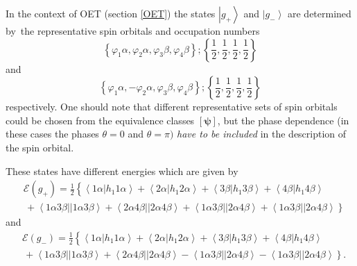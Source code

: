 \documentclass[aps,preprint]{revtex4}%
\begin{document}
In the context of OET (section \ref{OET}) the states $\left\vert
g_{+}\right\rangle $ and $\left\vert g_{-}\right\rangle $ are determined
by\ the representative spin orbitals and occupation numbers
\begin{equation}
\left\{  \varphi_{1}\alpha,\varphi_{2}\alpha,\varphi_{3}\beta,\varphi_{4}%
\beta\right\}  ;\left\{  \frac{1}{2},\frac{1}{2},\frac{1}{2},\frac{1}%
{2}\right\}
\end{equation}
and%
\begin{equation}
\left\{  \varphi_{1}\alpha,-\varphi_{2}\alpha,\varphi_{3}\beta,\varphi
_{4}\beta\right\}  ;\left\{  \frac{1}{2},\frac{1}{2},\frac{1}{2},\frac{1}%
{2}\right\}
\end{equation}
respectively. One should note that different representative sets of spin
orbitals could be chosen from the equivalence classes $\left[
\bm{\psi }\right]  $, but the phase dependence (in these cases the phases
$\theta=0$ and $\theta=\pi)$ \emph{have to be included} in the description of
the spin orbital.

These states have different energies which are given by
\begin{align}
&  \mathcal{E}\left(  g_{+}\right)  =\frac{1}{2}\left\{  \overset
{}{\left\langle 1\alpha\left\vert h_{1}1\alpha\right.  \right\rangle
+\left\langle 2\alpha\left\vert h_{1}2\alpha\right.  \right\rangle
+\left\langle 3\beta\left\vert h_{1}3\beta\right.  \right\rangle +\left\langle
4\beta\left\vert h_{1}4\beta\right.  \right\rangle }\right. \nonumber\\
&  \left.  \,+\left\langle 1\alpha3\beta\right\vert \left\vert 1\alpha
3\beta\right\rangle +\left\langle 2\alpha4\beta\right\vert \left\vert
2\alpha4\beta\right\rangle +\left\langle 1\alpha3\beta\right\vert \left\vert
2\alpha4\beta\right\rangle +\left\langle 1\alpha3\beta\right\vert \left\vert
2\alpha4\beta\right\rangle \overset{}{}\right\}  \label{E+}%
\end{align}
and
\begin{align}
&  \mathcal{E}\left(  g_{-}\right)  =\frac{1}{2}\left\{  \overset
{}{\left\langle 1\alpha\left\vert h_{1}1\alpha\right.  \right\rangle
+\left\langle 2\alpha\left\vert h_{1}2\alpha\right.  \right\rangle
+\left\langle 3\beta\left\vert h_{1}3\beta\right.  \right\rangle +\left\langle
4\beta\left\vert h_{1}4\beta\right.  \right\rangle }\right. \nonumber\\
&  \left.  \,+\left\langle 1\alpha3\beta\right\vert \left\vert 1\alpha
3\beta\right\rangle +\left\langle 2\alpha4\beta\right\vert \left\vert
2\alpha4\beta\right\rangle -\left\langle 1\alpha3\beta\right\vert \left\vert
2\alpha4\beta\right\rangle -\left\langle 1\alpha3\beta\right\vert \left\vert
2\alpha4\beta\right\rangle \overset{}{}\right\}  . \label{E-}%
\end{align}
\end{document}
